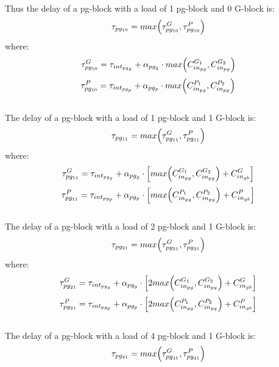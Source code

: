 Thus the delay of a pg-block with a load of 1 pg-block and 0 G-block is:
\begin{equation}
\tau_{pg_{10}} = max\Bigl( \tau_{pg_{10}}^G, \tau_{pg_{10}}^P \Bigr)
\end{equation}
 where:
\begin{equation}
\tau_{pg_{10}}^G = \tau_{int_{pg_g}} + \alpha_{pg_g} \cdot max\Bigl( C_{in_{pg}}^{G_1}, C_{in_{pg}}^{G_2}  \Bigr)
\end{equation}
\begin{equation}
\tau_{pg_{10}}^P = \tau_{int_{pg_p}} + \alpha_{pg_p} \cdot max\Bigl( C_{in_{pg}}^{P_1}, C_{in_{pg}}^{P_2}  \Bigr)
\end{equation}
\\
The delay of a pg-block with a load of 1 pg-block and 1 G-block is:
\begin{equation}
\tau_{pg_{11}} = max\Bigl( \tau_{pg_{11}}^G, \tau_{pg_{11}}^P \Bigr)
\end{equation}
 where:
\begin{equation}
\tau_{pg_{11}}^G = \tau_{int_{pg_g}} + \alpha_{pg_g} \cdot \Bigl[ max\Bigl( C_{in_{pg}}^{G_1}, C_{in_{pg}}^{G_2}  \Bigr) + C_{in_{gb}}^{G} \Bigr]
\end{equation}
\begin{equation}
\tau_{pg_{11}}^P = \tau_{int_{pg_p}} + \alpha_{pg_p} \cdot \Bigl[ max\Bigl( C_{in_{pg}}^{P_1}, C_{in_{pg}}^{P_2}  \Bigr) + C_{in_{gb}}^{P} \Bigr]
\end{equation}
\\
The delay of a pg-block with a load of 2 pg-block and 1 G-block is:
\begin{equation}
\tau_{pg_{21}} = max\Bigl( \tau_{pg_{21}}^G, \tau_{pg_{21}}^P \Bigr)
\end{equation}
 where:
\begin{equation}
\tau_{pg_{21}}^G = \tau_{int_{pg_g}} + \alpha_{pg_g} \cdot \Bigl[ 2max\Bigl( C_{in_{pg}}^{G_1}, C_{in_{pg}}^{G_2}  \Bigr) + C_{in_{gb}}^{G} \Bigr]
\end{equation}
\begin{equation}
\tau_{pg_{21}}^P = \tau_{int_{pg_p}} + \alpha_{pg_p} \cdot \Bigl[ 2max\Bigl( C_{in_{pg}}^{P_1}, C_{in_{pg}}^{P_2}  \Bigr) + C_{in_{gb}}^{P} \Bigr]
\end{equation}
\\
The delay of a pg-block with a load of 4 pg-block and 1 G-block is:
\begin{equation}
\tau_{pg_{41}} = max\Bigl( \tau_{pg_{41}}^G, \tau_{pg_{41}}^P \Bigr)
\end{equation}
